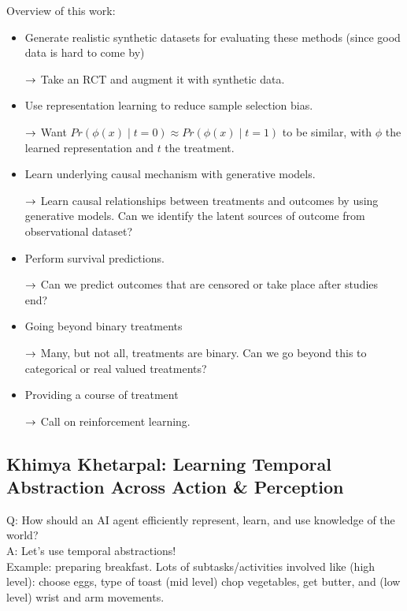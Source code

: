 Overview of this work:
\begin{itemize}
    \item Generate realistic synthetic datasets for evaluating these methods (since good data is hard to come by)
    
    $\rightarrow$ Take an RCT and augment it with synthetic data.
    
    \item Use representation learning to reduce sample selection bias.
    
    $\rightarrow$ Want $Pr(\phi(x) \mid t=0) \approx Pr(\phi(x) \mid t=1)$ to be similar, with $\phi$ the learned representation and $t$ the treatment.
    
    \item Learn underlying causal mechanism with generative models.
    
    $\rightarrow$ Learn causal relationships between treatments and outcomes by using generative models. Can we identify the latent sources of outcome from observational dataset?
    
    \item Perform survival predictions.
    
    $\rightarrow$ Can we predict outcomes that are censored or take place after studies end?
    
    \item Going beyond binary treatments
    
    $\rightarrow$ Many, but not all, treatments are binary. Can we go beyond this to categorical or real valued treatments?
    
    \item Providing a course of treatment
    
    $\rightarrow$ Call on reinforcement learning.

\end{itemize}



\spacerule
\subsection{Khimya Khetarpal: Learning Temporal Abstraction Across Action \& Perception}

Q: How should an AI agent efficiently represent, learn, and use knowledge of the world? \\

A: Let's use temporal abstractions! \\

Example: preparing breakfast. Lots of subtasks/activities involved like (high level): choose eggs, type of toast (mid level) chop vegetables, get butter, and (low level) wrist and arm movements. \\

